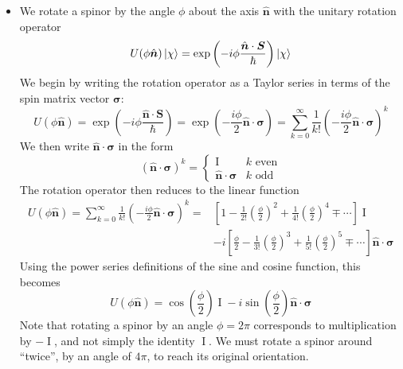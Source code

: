 \documentclass[11pt, a4paper]{article}
\renewcommand{\vec}[1]{\bm{#1}}  %
\newcommand{\uvec}[1]{\hat{\vec{#1}}}  %
\renewcommand{\S}{\vec{S}}  %
\newcommand{\II}{\operatorname{I}}  %
\begin{document}
\begin{itemize}
	\item We rotate a spinor by the angle $ \phi $ about the axis $ \uvec{n} $ with the unitary rotation operator
	\begin{equation*}
		U(\phi \uvec{n})\ket{\chi} = \exp \left(-i\phi \frac{\uvec{n}\cdot \S}{\hbar}\right) \ket{\chi}
	\end{equation*}
	We begin by writing the rotation operator as a Taylor series in terms of the spin matrix vector $ \vec{\sigma} $:
	\begin{equation*}
		U(\phi \uvec{n}) = \exp \left(-i\phi \frac{\uvec{n}\cdot \S}{\hbar}\right) = \exp \left(-\frac{i\phi}{2}\uvec{n}\cdot \vec{\sigma}\right) = \sum_{k = 0}^{\infty}\frac{1}{k!}\left(-\frac{i\phi}{2}\uvec{n}\cdot \vec{\sigma}\right)^{k}
	\end{equation*}
	We then write $ \uvec{n} \cdot \vec{\sigma} $ in the form
	\begin{equation*}
		(\uvec{n} \cdot \vec{\sigma} )^{k} = 
		\begin{cases}
		\II & k \text{ even}\\
		\uvec{n} \cdot \vec{\sigma} & k \text{ odd}
		\end{cases}
	\end{equation*} 
	The rotation operator then reduces to the linear function
	\begin{align*}
		U(\phi \uvec{n}) = \sum_{k = 0}^{\infty}\frac{1}{k!}\left(-\frac{i\phi}{2}\uvec{n}\cdot \vec{\sigma}\right)^{k} = &\left[1 - \frac{1}{2!}\left(\frac{\phi}{2}\right)^{2} + \frac{1}{4!}\left(\frac{\phi}{2}\right)^{4} \mp \cdots \right]\II \\
		& - i\left[\frac{\phi}{2} - \frac{1}{3!}\left(\frac{\phi}{2}\right)^{3} + \frac{1}{5!}\left(\frac{\phi}{2}\right)^{5} \mp \cdots \right]\uvec{n} \cdot \vec{\sigma}
	\end{align*}
	Using the power series definitions of the sine and cosine function, this becomes
	\begin{equation*}
		U(\phi \uvec{n}) = \cos \left(\frac{\phi}{2}\right)\II - i \sin \left(\frac{\phi}{2}\right)\uvec{n} \cdot \vec{\sigma}
	\end{equation*}
	Note that rotating a spinor by an angle $ \phi = 2\pi $ corresponds to multiplication by $ -\II $, and not simply the identity $ \II $. We must rotate a spinor around ``twice'', by an angle of $ 4\pi $, to reach its original orientation.
	

\end{itemize}
\end{document}
